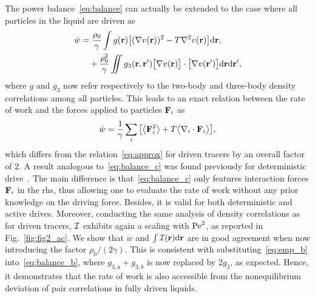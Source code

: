 \documentclass[superscriptaddress, twocolumn, prx, longbibliography, nofootinbib]{revtex4-1}
\newcommand{\dd}{\text{d}}
\begin{document}
The power balance~\eqref{eq:balance} can actually be extended to the case where all particles in the liquid are driven as
\begin{equation}\label{eq:balance_b}
	\begin{aligned}
		\dot w &= \frac{\rho_0}{\gamma} \int g({\bf r}) \big[(\nabla v({\bf r}))^2 - T \nabla^2 v({\bf r})\big] \dd{\bf r} ,
		\\
		&\quad + \frac{\rho_0^2}{\gamma} \iint g_3({\bf r}, {\bf r}') \big[\nabla v({\bf r})\big] \cdot \big[\nabla v({\bf r}')\big] \dd{\bf r} \dd{\bf r}' ,
	\end{aligned}
\end{equation}
where $g$ and $g_3$ now refer respectively to the two-body and three-body density correlations among all particles. This leads to an exact relation between the rate of work and the forces applied to particles ${\bf F}_i$ as
\begin{equation}\label{eq:balance_c}
	\dot w = \frac{1}{\gamma}\sum_i \big[ \big\langle{\bf F}_i^2\big\rangle + T \big\langle\nabla_i\cdot{\bf F}_i\big\rangle \big] ,
\end{equation}
which differs from the relation~\eqref{eq:approx} for driven tracers by an overall factor of $2$. A result analogous to~\eqref{eq:balance_c} was found previously for deterministic drive~\cite{Maes2010, Maes2015}. The main difference is that~\eqref{eq:balance_c} only features interaction forces ${\bf F}_i$ in the rhs, thus allowing one to evaluate the rate of work without any prior knowledge on the driving force. Besides, it is valid for both deterministic and active drives. Moreover, conducting the same analysis of density correlations as for driven tracers, ${\cal I}$ exhibits again a scaling with ${\rm Pe}^2$, as reported in Fig.~\ref{fig:fig2_ac}. We show that $\dot w$ and $\int{\cal I}({\bf r}){\rm d}{\bf r}$ are in good agreement when now introducing the factor $\rho_0/(2\gamma)$. This is consistent with substituting~\eqref{eq:emp_b} into~\eqref{eq:balance_b}, where $g_{3,a}+g_{3,b}$ is now replaced by $2g_3$, as expected. Hence, it demonstrates that the rate of work is also accessible from the nonequilibrium deviation of pair correlations in fully driven liquids.
\end{document}
